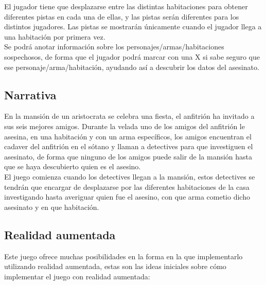 El jugador tiene que desplazarse entre las distintas habitaciones para obtener diferentes pistas en cada una de ellas, y las pistas serán diferentes para los distintos jugadores. Las pistas se mostrarán únicamente cuando el jugador llega a una habitación por primera vez.\\

Se podrá anotar información sobre los personajes/armas/habitaciones sospechosos, de forma que el jugador podrá marcar con una X si sabe seguro que ese personaje/arma/habitación, ayudando así a descubrir los datos del asesinato.

\subsection{Narrativa}
En la mansión de un aristocrata se celebra una fiesta, el anfitrión ha invitado a sus seis mejores amigos. Durante la velada uno de los amigos del anfitrión le asesina, en una habitación y con un arma específicos, los amigos encuentran el cadaver del anfitrión en el sótano y llaman a detectives para que investiguen el asesinato, de forma que ninguno de los amigos puede salir de la mansión hasta que se haya descubierto quien es el asesino.\\

El juego comienza cuando los detectives llegan a la mansión, estos detectives se tendrán que encargar de desplazarse por las diferentes habitaciones de la casa investigando hasta averiguar quien fue el asesino, con que arma cometio dicho asesinato y en que habitación.

\subsection{Realidad aumentada}
Este juego ofrece muchas posibilidades en la forma en la que implementarlo utilizando realidad aumentada, estas son las ideas iniciales sobre cómo implementar el juego con realidad aumentada:

